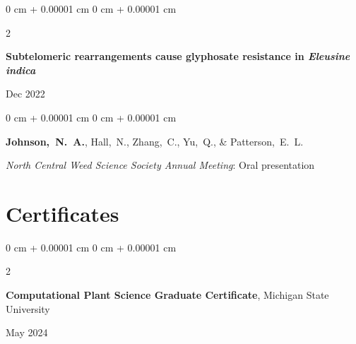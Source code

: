 \documentclass[10pt, letterpaper]{article}
\newenvironment{onecolentry}{
    \begin{adjustwidth}{
        0 cm + 0.00001 cm
    }{
        0 cm + 0.00001 cm
    }
}{
    \end{adjustwidth}
} %
\newenvironment{twocolentry}[2][]{
    \onecolentry
    \def\secondColumn{#2}
    \setcolumnwidth{\fill, 4.5 cm}
    \begin{paracol}{2}
}{
    \switchcolumn \raggedleft \secondColumn
    \end{paracol}
    \endonecolentry
} %
\begin{document}
        \begin{samepage}
            \begin{twocolentry}{
                Dec 2022
            }
                \textbf{Subtelomeric rearrangements cause glyphosate resistance in \textit{Eleusine indica}}
            \end{twocolentry}

            \vspace{0.10 cm}
            
            \begin{onecolentry}
                \mbox{\textbf{Johnson, N. A.}}, \mbox{Hall, N.}, \mbox{Zhang, C.}, \mbox{Yu, Q.}, \& \mbox{Patterson, E. L.}

                \vspace{0.10 cm}
                
                \textit{North Central Weed Science Society Annual Meeting}: Oral presentation
            \end{onecolentry}
        \end{samepage}              

       
%        
%
%
%            
%
%                




    \section{Certificates}




        \begin{samepage} 
            \begin{twocolentry}{
                May 2024
                }
                \textbf{Computational Plant Science Graduate Certificate}, Michigan State University
            \end{twocolentry}
        \end{samepage}  
\end{document}
